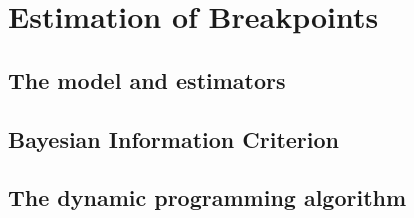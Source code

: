 \documentclass[main.tex]{subfiles}
\begin{document}
\section{Estimation of Breakpoints}
\label{sec:estimation_of_breakpoints}
\subsection{The model and estimators}
\label{subsec:the_model_and_estimators}
\subsection{Bayesian Information Criterion}
\label{subsec:bayesian_information_criterion}
\subsection{The dynamic programming algorithm}
\label{subsec:the_dynamic_programming_algorithm}

\biblio
\end{document}
